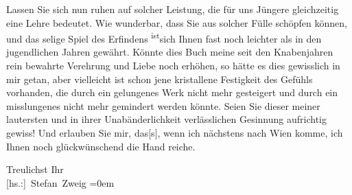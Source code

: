 \pstart
           Lassen Sie sich nun ruhen auf solcher Leistung, die für uns Jüngere gleichzeitig eine
               Lehre bedeutet. Wie wunderbar, dass Sie aus solcher Fülle schöpfen können, und das
               selige Spiel des Erfindens \substVorne{}\textsuperscript{ist}\substDazwischen{}sich\substHinten{} Ihnen fast noch leichter als in den jugendlichen Jahren gewährt. Könnte dies
                  Buch meine seit den
               Knabenjahren rein bewahrte Verehrung und Liebe noch erhöhen, so hätte es dies
               gewisslich in mir getan, aber vielleicht ist schon jene kristallene Festigkeit des
               Gefühls vorhanden, die durch ein gelungenes Werk nicht mehr gesteigert und durch ein
               misslungenes nicht mehr gemindert werden könnte. Seien Sie dieser meiner lautersten
               und in ihrer Unabänderlichkeit verlässlichen Gesinnung aufrichtig gewiss! Und
               erlauben Sie mir, das{[}s{]}, wenn ich nächstens nach Wien komme, ich Ihnen noch glückwünschend die Hand reiche.\pend
           
\pstart
           Treulichst Ihr{\\[\baselineskip]}\spacefill\mbox{{[}hs.:{]} Stefan Zweig}\pend
           \leftskip=0em{}\endnumbering{}  \newcommand{\dateiname}{L03689}\newcommand{\titel}{Stefan Zweig an Arthur Schnitzler, 15. 5. 1928}\newcommand{\editorInnen}{Selma Jahnke und Martin Anton Müller}
